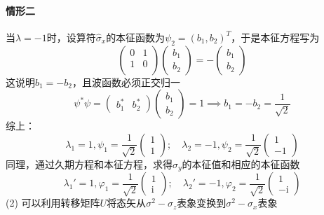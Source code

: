 \begin{solution}
    \paragraph{情形二} 当$\lambda=-1$时，设算符$\hat{\sigma}_x$的本征函数为$\psi_2=(b_1, b_2)^T$，于是本征方程写为
    $$
        \begin{pmatrix}
            0 & 1 \\
            1 & 0 \\
        \end{pmatrix}\begin{pmatrix}
            b_1 \\
            b_2
        \end{pmatrix}
        =-\begin{pmatrix}
            b_1 \\
            b_2
        \end{pmatrix}
    $$
    这说明$b_1=-b_2$，且波函数必须正交归一
    $$
        \psi^*\psi
        =\begin{pmatrix}
            b_1^* & b_2^*
        \end{pmatrix}\begin{pmatrix}
            b_1 \\
            b_2
        \end{pmatrix}
        =1 \implies b_1=-b_2=\frac{1}{\sqrt{2}}
    $$
    综上：
    $$
        \lambda_1=1,\psi_1=\frac{1}{\sqrt{2}}\begin{pmatrix}1\\1\end{pmatrix};
        \quad
        \lambda_2=-1,\psi_2=\frac{1}{\sqrt{2}}\begin{pmatrix}1\\-1\end{pmatrix}
    $$
    同理，通过久期方程和本征方程，求得$\hat{\sigma}_y$的本征值和相应的本征函数
    $$
        \lambda_1'=1,\varphi_1=\frac{1}{\sqrt{2}}\begin{pmatrix}1\\\mathrm{i}\end{pmatrix};
        \quad
        \lambda_2'=-1,\varphi_2=\frac{1}{\sqrt{2}}\begin{pmatrix}1\\-\mathrm{i}\end{pmatrix}
    $$
    (2) 可以利用转移矩阵$U$将态矢从$\sigma^2-\sigma_z$表象变换到$\sigma^2-\sigma_x$表象
\end{solution}



